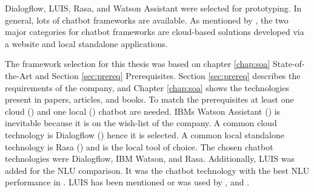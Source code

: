Dialogflow, LUIS, Rasa, and Watson Assistant were selected for prototyping.
In general, lots of chatbot frameworks are available.
As mentioned by \citet{kane2016role}, the two major categories for chatbot frameworks are cloud-based solutions developed via a website and local standalone applications.

The framework selection for this thesis was based on chapter \ref{chap:soa} State-of-the-Art and Section \ref{sec:prereq} Prerequisites.
Section \ref{sec:prereq} describes the requirements of the company, and Chapter \ref{chap:soa} shows the technologies present in papers, articles, and books.
To match the prerequisites at least one cloud (\citet{braunEvaluatingNLU, rahman2017programming}) and one local (\citet{braunEvaluatingNLU}) chatbot are needed.
IBMs Watson Assistant (\citet{rahman2017programming, pharmacybot, ieee2018watson, gregori2017evaluation}) is inevitable because it is on the wish-list of the company.
A common cloud technology is Dialogflow (\citet{braunEvaluatingNLU, dutta2017developing, singhbuilding, buiildChatbotsPython, rahman2017programming, ieee2018watson}) hence it is selected.
A common local standalone technology is Rasa (\citet{braunEvaluatingNLU, singhbuilding, rasabocklisch2017, buiildChatbotsPython, gregori2017evaluation}) and is the local tool of choice.
The chosen chatbot technologies were Dialogflow, IBM Watson, and Rasa.
Additionally, LUIS\cite{luis2015williams} was added for the NLU comparison.
It was the chatbot technology with the best NLU performance in \citet{braunEvaluatingNLU}.
LUIS has been mentioned or was used by \citet{singhbuilding, buiildChatbotsPython, rahman2017programming, dutta2017developing}, 
and \citet{gregori2017evaluation}.

